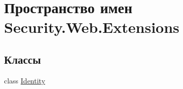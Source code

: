 \hypertarget{namespace_security_1_1_web_1_1_extensions}{}\section{Пространство имен Security.\+Web.\+Extensions}
\label{namespace_security_1_1_web_1_1_extensions}
\subsection*{Классы}
\begin{DoxyCompactItemize}
\item 
class \hyperlink{class_security_1_1_web_1_1_extensions_1_1_identity}{Identity}
\end{DoxyCompactItemize}
